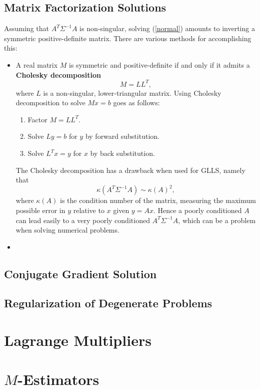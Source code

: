 \documentclass{amsart}
\begin{document}
\subsection{Matrix Factorization Solutions}
Assuming that $A^T \Sigma^{-1} A$ is non-singular, solving (\ref{normal}) amounts to inverting a
symmetric positive-definite matrix. There are various methods for accomplishing this:
\begin{itemize}
    \item A real matrix $M$ is symmetric and positive-definite if and only if it admits
    a \textbf{Cholesky decomposition}
    $$
    M = LL^T,
    $$
    where $L$ is a non-singular, lower-triangular matrix. Using Cholesky decomposition to solve
    $Mx = b$ goes as follows:
    \begin{enumerate}
        \item Factor $M = LL^T$.
        \item Solve $Ly = b$ for $y$ by forward substitution.
        \item Solve $L^Tx = y$ for $x$ by back substitution.
    \end{enumerate}
    The Cholesky decomposition has a drawback when used for GLLS, namely that
    $$
    \kappa(A^T \Sigma^{-1} A) \sim \kappa(A)^2,
    $$
    where $\kappa(A)$ is the condition
    number of the matrix, measuring the maximum possible error in $y$ relative to $x$ given
    $y = Ax$. Hence
    a poorly conditioned $A$ can lead easily to a very poorly conditioned $A^T \Sigma^{-1} A$, which
    can be a problem when solving numerical problems.

    \item 
\end{itemize}

\subsection{Conjugate Gradient Solution}
\subsection{Regularization of Degenerate Problems}

\section{Lagrange Multipliers}

\section {$M$-Estimators}
\end{document}
